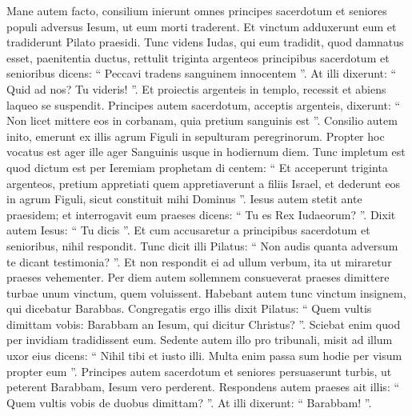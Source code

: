 \begin{biblechapter}
\begin{biblechapter}
\begin{biblechapter}
\begin{biblechapter}
\begin{biblechapter}
\begin{biblechapter}
\begin{biblechapter}
\begin{biblechapter}
\begin{biblechapter}
\begin{biblechapter}
\begin{biblechapter}
\begin{biblechapter}
\begin{biblechapter}
\begin{biblechapter}
\begin{biblechapter}
\begin{biblechapter}
\begin{biblechapter}
\begin{biblechapter}
\begin{biblechapter}
\begin{biblechapter}
\begin{biblechapter}
\begin{biblechapter}
\begin{biblechapter}
\begin{biblechapter}
\begin{biblechapter}
\begin{biblechapter}
\begin{biblechapter}
\verse Mane autem facto, consilium inierunt omnes principes sacerdotum et seniores populi adversus Iesum, ut eum morti traderent. 
\verse Et vinctum adduxerunt eum et tradiderunt Pilato praesidi.
 \verse Tunc videns Iudas, qui eum tradidit, quod damnatus esset, paenitentia ductus, rettulit triginta argenteos principibus sacerdotum et senioribus 
\verse dicens: “ Peccavi tradens sanguinem innocentem ”. At illi dixerunt: “ Quid ad nos? Tu videris! ”. 
\verse Et proiectis argenteis in templo, recessit et abiens laqueo se suspendit. 
\verse Principes autem sacerdotum, acceptis argenteis, dixerunt: “ Non licet mittere eos in corbanam, quia pretium sanguinis est ”. 
\verse Consilio autem inito, emerunt ex illis agrum Figuli in sepulturam peregrinorum. 
\verse Propter hoc vocatus est ager ille ager Sanguinis usque in hodiernum diem. 
\verse Tunc impletum est quod dictum est per Ieremiam prophetam di centem: “ Et acceperunt triginta argenteos, pretium appretiati quem appretiaverunt a filiis Israel, 
\verse et dederunt eos in agrum Figuli, sicut constituit mihi Dominus ”.
 \verse Iesus autem stetit ante praesidem; et interrogavit eum praeses dicens: “ Tu es Rex Iudaeorum? ”. Dixit autem Iesus: “ Tu dicis ”. 
\verse Et cum accusaretur a principibus sacerdotum et senioribus, nihil respondit. 
\verse Tunc dicit illi Pilatus: “ Non audis quanta adversum te dicant testimonia? ”. 
\verse Et non respondit ei ad ullum verbum, ita ut miraretur praeses vehementer.
 \verse Per diem autem sollemnem consueverat praeses dimittere turbae unum vinctum, quem voluissent. 
\verse Habebant autem tunc vinctum insignem, qui dicebatur Barabbas. 
\verse Congregatis ergo illis dixit Pilatus: “ Quem vultis dimittam vobis: Barabbam an Iesum, qui dicitur Christus? ”. 
\verse Sciebat enim quod per invidiam tradidissent eum.
 \verse Sedente autem illo pro tribunali, misit ad illum uxor eius dicens: “ Nihil tibi et iusto illi. Multa enim passa sum hodie per visum propter eum ”. 
\verse Principes autem sacerdotum et seniores persuaserunt turbis, ut peterent Barabbam, Iesum vero perderent. 
\verse Respondens autem praeses ait illis: “ Quem vultis vobis de duobus dimittam? ”. At illi dixerunt: “ Barabbam! ”. 

\end{biblechapter}
\end{biblechapter}
\end{biblechapter}
\end{biblechapter}
\end{biblechapter}
\end{biblechapter}
\end{biblechapter}
\end{biblechapter}
\end{biblechapter}
\end{biblechapter}
\end{biblechapter}
\end{biblechapter}
\end{biblechapter}
\end{biblechapter}
\end{biblechapter}
\end{biblechapter}
\end{biblechapter}
\end{biblechapter}
\end{biblechapter}
\end{biblechapter}
\end{biblechapter}
\end{biblechapter}
\end{biblechapter}
\end{biblechapter}
\end{biblechapter}
\end{biblechapter}
\end{biblechapter}
